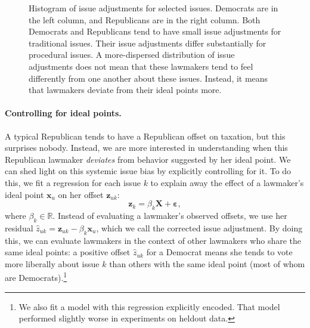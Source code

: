 \begin{figure}
\begin{tabular}{cc}
  \end{tabular}
  \caption{Histogram of issue adjustments for selected
    issues. Democrats are in the left column, and Republicans are in
    the right column. Both Democrats and Republicans tend to have
    small issue adjustments for traditional issues.  Their issue
    adjustments differ substantially for procedural issues. A
    more-dispersed distribution of issue adjustments does not mean
    that these lawmakers tend to feel differently from one another
    about these issues.  Instead, it means that lawmakers deviate from
    their ideal points more.  }
  \label{figure:issue_adjustment_distribution}
\end{figure}

\label{section:conditional_offets}

\paragraph{Controlling for ideal points.}

A typical Republican tends to have a Republican offset on taxation,
but this surprises nobody.  Instead, we are more interested in
understanding when this Republican lawmaker \emph{deviates} from
behavior suggested by her ideal point.  We can shed light on this
systemic issue bias by explicitly controlling for it.  To do this, we
fit a regression for each issue $k$ to explain away the effect of a
lawmaker's ideal point $\bm x_u$ on her offset $\bm z_{uk}$:
\[
  \bm z_{k} = \beta_k \bm X + \bm \varepsilon,
\]
where $\beta_k \in \mathbb{R}$.  Instead of evaluating a lawmaker's
observed offsets, we use her residual $\hat z_{uk} = \bm z_{uk} -
\beta_k \bm x_u$, which we call the corrected issue adjustment.  By
doing this, we can evaluate lawmakers in the context of other
lawmakers who share the same ideal points: a positive offset $\hat
z_{uk}$ for a Democrat means she tends to vote more liberally about
issue $k$ than others with the same ideal point (most of whom are
Democrats).\footnote{We also fit a model with this regression
  explicitly encoded.  That model performed slightly worse in
  experiments on heldout data.}

